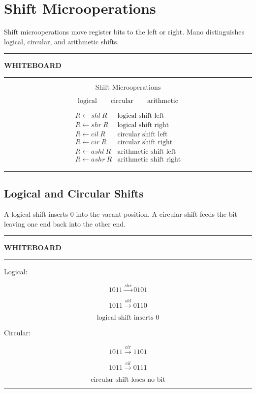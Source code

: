 \documentclass[11pt]{article}
\newenvironment{whiteboard}
{
    \par\medskip
    \hrule
    \vspace{0.35em}
    \noindent\textbf{\large WHITEBOARD}
    \par\vspace{0.3em}
    \hrule
    \vspace{0.65em}
}
{
    \vspace{0.45em}
    \hrule
    \par\medskip
}
\begin{document}
\section{Shift Microoperations}

Shift microoperations move register bits to the left or right. Mano distinguishes logical, circular, and arithmetic shifts.

\begin{whiteboard}

\[
\boxed{\text{Shift Microoperations}}
\]

\[
\boxed{\text{logical}\qquad\text{circular}\qquad\text{arithmetic}}
\]

\[
\begin{array}{l|l}
R\leftarrow shl\ R&\text{logical shift left}\\
R\leftarrow shr\ R&\text{logical shift right}\\
R\leftarrow cil\ R&\text{circular shift left}\\
R\leftarrow cir\ R&\text{circular shift right}\\
R\leftarrow ashl\ R&\text{arithmetic shift left}\\
R\leftarrow ashr\ R&\text{arithmetic shift right}
\end{array}
\]

\end{whiteboard}

\subsection{Logical and Circular Shifts}

A logical shift inserts 0 into the vacant position. A circular shift feeds the bit leaving one end back into the other end.

\begin{whiteboard}

Logical:

\[
1011\xrightarrow{shr}0101
\]

\[
1011\xrightarrow{shl}0110
\]

\[
\boxed{\text{logical shift inserts }0}
\]

Circular:

\[
1011\xrightarrow{cir}1101
\]

\[
1011\xrightarrow{cil}0111
\]

\[
\boxed{\text{circular shift loses no bit}}
\]

\end{whiteboard}
\end{document}
